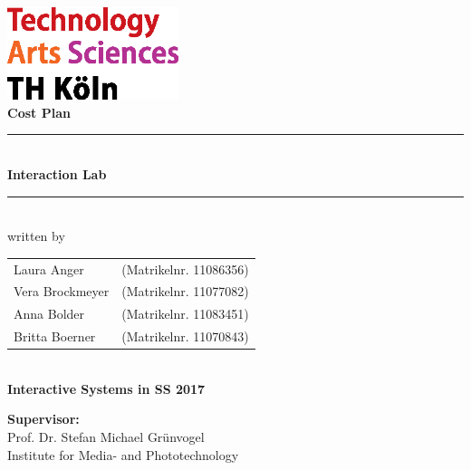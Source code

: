 \thispagestyle{empty}
\begin{center}
	\includegraphics[width=5cm]{Bilder/logo_TH}\\[12ex]
	{\Huge\textbf{Cost Plan}}\\[8ex]
	\rule{.8\textwidth}{.2pt}
	{\Large\\[1ex] \textbf{Interaction Lab}}\\
	\rule{.8\textwidth}{.2pt}\\[10ex]
	written by\\[2ex]
	\begin{tabular}{ll}
		Laura Anger &(Matrikelnr. 11086356)\\ 
		Vera Brockmeyer &(Matrikelnr. 11077082)\\
		Anna Bolder &(Matrikelnr. 11083451)\\
		Britta Boerner &(Matrikelnr. 11070843)\\
	\end{tabular}\\[10ex]
	\textbf{Interactive Systems in SS 2017}\\			
\end{center}
\vfill
\begin{flushleft}
	{\bf Supervisor:}\\
	Prof. Dr. Stefan Michael Grünvogel\\
	Institute for Media- and Phototechnology
\end{flushleft}
\newpage
